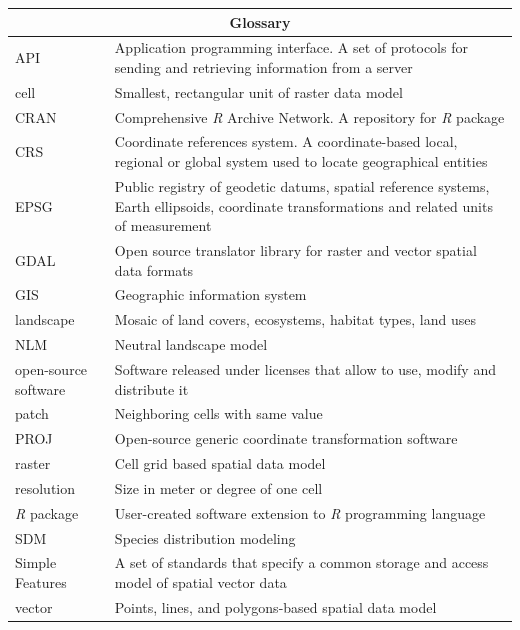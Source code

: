 \documentclass[smallextended]{svjour3}       %
\begin{document}
\begin{table}[H]

\small

\begin{tabularx}{1.15\textwidth}{lX}

\hline

\multicolumn{2}{c}{Glossary} \\

\hline

API & Application programming interface. A set of protocols for sending and retrieving information from a server \\
cell & Smallest, rectangular unit of raster data model \\
CRAN & Comprehensive \textit{R} Archive Network. A repository for \textit{R} package \\
CRS & Coordinate references system. A coordinate-based local, regional or global system used to locate geographical entities \\
EPSG & Public registry of geodetic datums, spatial reference systems, Earth ellipsoids, coordinate transformations and related units of measurement \\
GDAL & Open source translator library for raster and vector spatial data formats \\
GIS & Geographic information system \\
landscape & Mosaic of land covers, ecosystems, habitat types, land uses \\
NLM & Neutral landscape model \\
open-source software & Software released under licenses that allow to use, modify and distribute it \\
patch & Neighboring cells with same value \\
PROJ & Open-source generic coordinate transformation software \\
raster & Cell grid based spatial data model \\
resolution & Size in meter or degree of one cell \\
\textit{R} package & User-created software extension to \textit{R} programming language \\
SDM & Species distribution modeling \\
Simple Features & A set of standards that specify a common storage and access model of spatial vector data \\
vector & Points, lines, and polygons-based spatial data model \\

\hline

\end{tabularx}
\end{table}
\end{document}
